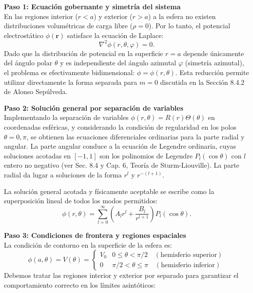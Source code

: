 \documentclass[a4paper]{article}
\begin{document}
\vspace{0.3cm}
\noindent\textbf{Paso 1: Ecuación gobernante y simetría del sistema}\\
En las regiones interior ($r < a$) y exterior ($r > a$) a la esfera no existen distribuciones volumétricas de carga libre ($\rho = 0$). Por lo tanto, el potencial electrostático $\phi(\mathbf{r})$ satisface la ecuación de Laplace:
$$
\nabla^2 \phi(r, \theta, \varphi) = 0.
$$
Dado que la distribución de potencial en la superficie $r=a$ depende únicamente del ángulo polar $\theta$ y es independiente del ángulo azimutal $\varphi$ (simetría azimutal), el problema es efectivamente bidimensional: $\phi = \phi(r, \theta)$. Esta reducción permite utilizar directamente la forma separada para $m=0$ discutida en la Sección 8.4.2 de Alonso Sepúlveda.

\vspace{0.3cm}
\noindent\textbf{Paso 2: Solución general por separación de variables}\\
Implementando la separación de variables $\phi(r, \theta) = R(r)\Theta(\theta)$ en coordenadas esféricas, y considerando la condición de regularidad en los polos $\theta = 0, \pi$, se obtienen las ecuaciones diferenciales ordinarias para la parte radial y angular. La parte angular conduce a la ecuación de Legendre ordinaria, cuyas soluciones acotadas en $[-1, 1]$ son los polinomios de Legendre $P_l(\cos\theta)$ con $l$ entero no negativo (ver Sec. 8.4 y Cap. 6, Teoría de Sturm-Liouville). La parte radial da lugar a soluciones de la forma $r^l$ y $r^{-(l+1)}$.

La solución general acotada y físicamente aceptable se escribe como la superposición lineal de todos los modos permitidos:
$$
\phi(r, \theta) = \sum_{l=0}^{\infty} \left( A_l r^l + \frac{B_l}{r^{l+1}} \right) P_l(\cos\theta).
$$

\vspace{0.3cm}
\noindent\textbf{Paso 3: Condiciones de frontera y regiones espaciales}\\
La condición de contorno en la superficie de la esfera es:
$$
\phi(a, \theta) = V(\theta) = \begin{cases} 
V_0 & 0 \leq \theta < \pi/2 \quad (\text{hemisferio superior}) \\
0   & \pi/2 < \theta \leq \pi \quad (\text{hemisferio inferior})
\end{cases}
$$
Debemos tratar las regiones interior y exterior por separado para garantizar el comportamiento correcto en los límites asintóticos:
\end{document}
